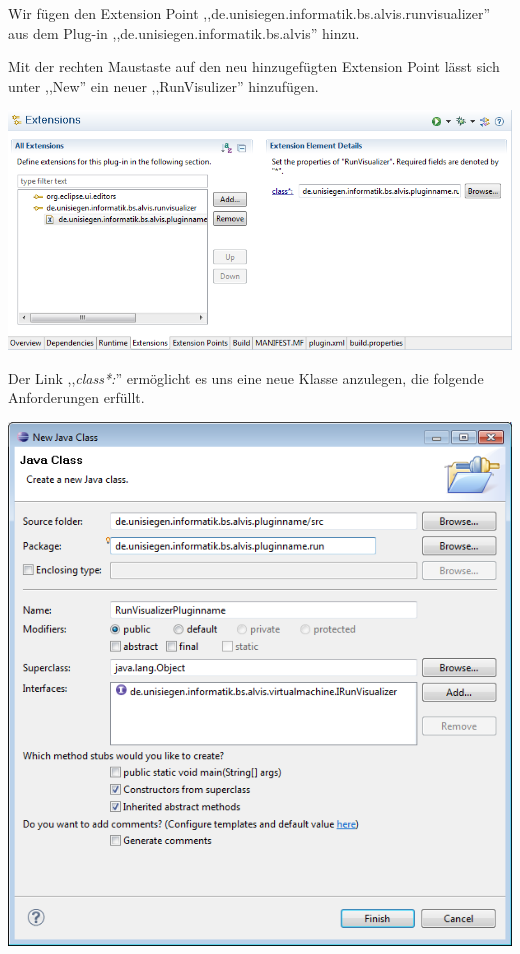\documentclass[10pt,a4paper]{article}
\begin{document}
Wir fügen den Extension Point ,,de.unisiegen.informatik.bs.alvis.runvisualizer'' aus dem Plug-in  ,,de.unisiegen.informatik.bs.alvis'' hinzu. 

Mit der rechten Maustaste auf den neu hinzugefügten Extension Point lässt sich unter ,,New'' ein neuer ,,RunVisulizer'' hinzufügen.

\begin{center}
\includegraphics[scale=0.58]{images/new_plugin_runvisualizer_01}
\end{center}

Der Link ,,\emph{class*:}'' ermöglicht es uns eine neue Klasse anzulegen, die folgende Anforderungen erfüllt.

\begin{center}
\includegraphics[scale=0.478]{images/new_plugin_runvisualizer_00}
\end{center}
\end{document}
